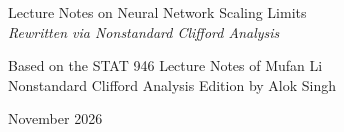 \documentclass[11pt,oneside]{report}
\begin{document}
\hypersetup{pageanchor=false}
\begin{titlepage}
\centering
\vspace*{3.2in}
{\LARGE Lecture Notes on Neural Network Scaling Limits\\[0.4em]
\large\itshape Rewritten via Nonstandard Clifford Analysis\par}
\vspace{1.8em}
{\large Based on the STAT 946 Lecture Notes of Mufan Li\\[0.35em]
\normalsize Nonstandard Clifford Analysis Edition by Alok Singh\par}
\vspace{1.2em}
{\normalsize November 2026\par}
\vfill
\end{titlepage}
\hypersetup{pageanchor=true}

\tableofcontents
\clearpage










\appendix






\end{document}
